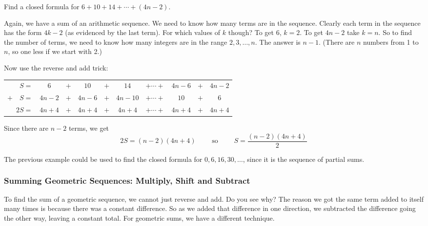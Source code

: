 \documentclass[12pt]{article}
\begin{document}
\begin{example}
  Find a closed formula for $6 + 10 + 14 + \cdots + (4n - 2)$.
  \begin{solution}
    Again, we have a sum of an arithmetic sequence.  We need to know how many terms are in the sequence.  Clearly each term in the sequence has the form $4k -2$ (as evidenced by the last term).  For which values of $k$ though?  To get 6, $k = 2$.  To get $4n-2$ take $k = n$.  So to find the number of terms, we need to know how many integers are in the range $2,3,\ldots, n$.  The answer is $n-1$.  (There are $n$ numbers from 1 to $n$, so one less if we start with 2.)

    Now use the reverse and add trick:

        \begin{center}
    \begin{tabular}{rccccccccc}
      $S  =  $& $6 $&$ + $& $10$ & $ + $ & $14$ & $+ \cdots + $ & $4n-6$ &$ + $ & $4n-2$ \\
     $+ \quad S  = $& $4n-2$ & $+ $ & $4n-6$ & $ + $ & $4n-10$& $+ \cdots + $& $10$ & $+$ & 6 \\ \hline
     $2S  = $& $4n+4$ & $+ $ & $4n+4$ & $ + $ & $4n+4$& $+ \cdots + $&$4n+4$ & $+$ & $4n+4$ \\
    \end{tabular}
    \end{center}

    Since there are $n-2$ terms, we get
    \[2S = (n-2)(4n+4)\qquad \mbox{ so }\qquad S = \frac{(n-2)(4n+4)}{2}\]
  \end{solution}

\end{example}

The previous example could be used to find the closed formula for $0, 6, 16, 30, \ldots$, since it is the sequence of partial sums.


\subsubsection*{Summing Geometric Sequences: Multiply, Shift and Subtract}

To find the sum of a geometric sequence, we cannot just reverse and add.  Do you see why?  The reason we got the same term added to itself many times is because there was a constant difference.  So as we added that difference in one direction, we subtracted the difference going the other way, leaving a constant total.  For geometric sums, we have a different technique.
\end{document}
